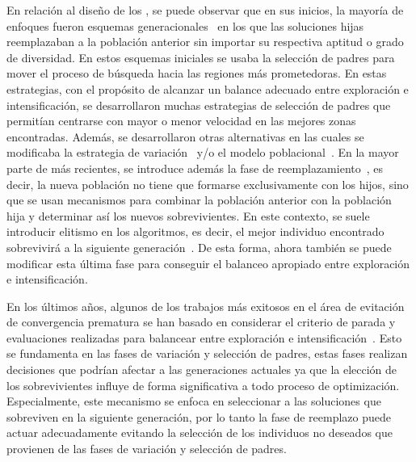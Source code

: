 En relación al diseño de los \EAS{}, se puede observar que en sus inicios, la mayoría de enfoques fueron esquemas generacionales~\cite{de2006evolutionary} en los 
que las soluciones hijas reemplazaban a la población anterior sin importar su respectiva aptitud o grado de diversidad.
%
En estos esquemas iniciales se usaba la selección de padres para mover el proceso de búsqueda hacia las regiones más prometedoras.
%
En estas estrategias, con el propósito de alcanzar un balance adecuado entre exploración e intensificación, se desarrollaron muchas estrategias de selección de padres
que permitían centrarse con mayor o menor velocidad en las mejores zonas encontradas.
%
Además, se desarrollaron otras alternativas en las cuales se modificaba la estrategia de variación~\cite{Joel:herrera2003fuzzy} y/o el modelo poblacional~\cite{alba2005parallel}.
%
En la mayor parte de \EAS{} más recientes, se introduce además la fase de reemplazamiento~\cite{eiben2003introduction}, es decir, la nueva población no tiene que formarse exclusivamente con los hijos,
sino que se usan mecanismos para combinar la población anterior con la población hija y determinar así los nuevos sobrevivientes.
%
En este contexto, se suele introducir elitismo en los algoritmos, es decir, el mejor individuo encontrado sobrevivirá a la siguiente generación~\cite{Joel:CHC}.
%
De esta forma, ahora también se puede modificar esta última fase para conseguir el balanceo apropiado entre exploración e intensificación.

En los últimos años, algunos de los trabajos más exitosos en el área de evitación de convergencia prematura se han basado en considerar el criterio de parada y evaluaciones
realizadas para balancear entre exploración e intensificación~\cite{segura2016novel}.
%
Esto se fundamenta en las fases de variación y selección de padres, estas fases realizan decisiones que podrían afectar a las generaciones actuales ya que la elección de los sobrevivientes influye  de forma significativa a todo proceso de optimización.
%
Especialmente, este mecanismo se enfoca en seleccionar a las soluciones que sobreviven en la siguiente generación, por lo tanto la fase de reemplazo puede actuar adecuadamente evitando la selección de los individuos no deseados que provienen de las fases de variación y selección de padres.

